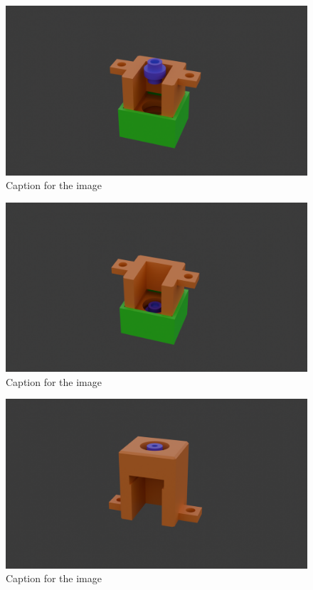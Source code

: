 \documentclass[landscape,twocolumn]{article}
\begin{document}

\begin{figure}[p]
    \centering
    \includegraphics[width=0.875\linewidth]{d_a.png} %
    \caption{Caption for the image}
\end{figure}


\begin{figure}[p]
    \centering
    \includegraphics[width=0.875\linewidth]{d_b.png} %
    \caption{Caption for the image}
\end{figure}


\begin{figure}[p]
    \centering
    \includegraphics[width=0.875\linewidth]{e.png} %
    \caption{Caption for the image}
\end{figure}
\end{document}
